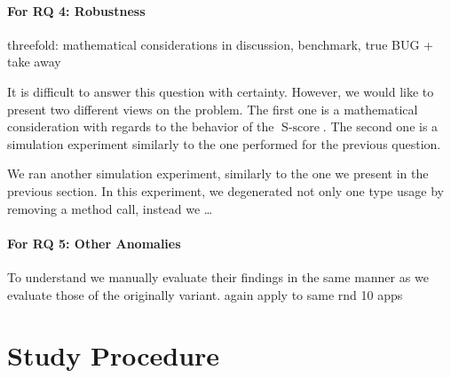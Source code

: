 \paragraph{For RQ 4: Robustness}

threefold: 
mathematical considerations in discussion, benchmark, true BUG + take away

It is difficult to answer this question with certainty.
However, we would like to present two different views on the problem.
The first one is a mathematical consideration with regards to the behavior of the $\operatorname{S-score}$.
The second one is a simulation experiment similarly to the one performed for the previous question.

We ran another simulation experiment, similarly to the one we present in the previous section.
In this experiment, we degenerated not only one type usage by removing a method call, instead we  \ldots
{}


\paragraph{For RQ 5: Other Anomalies}

To understand  we manually evaluate their findings in the same manner as we evaluate those of the originally variant.
again apply to same rnd 10 apps


\section{Study Procedure}

